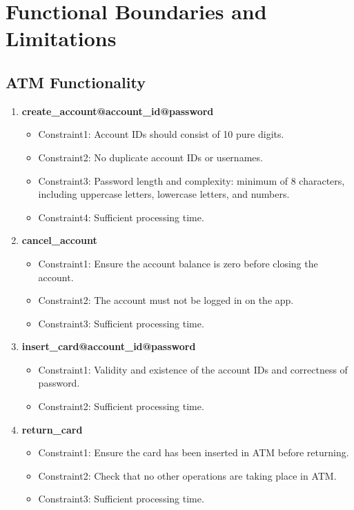 \documentclass[12pt]{article}
\begin{document}
\section{Functional Boundaries and Limitations}
\subsection{ATM Functionality}

\begin{enumerate}
    \item \textbf{create\_account@account\_id@password}
        \begin{itemize}

            \item Constraint1: Account IDs should consist of 10 pure digits.
            \item Constraint2: No duplicate account IDs or usernames.
            \item Constraint3: Password length and complexity: minimum of 8 characters, including uppercase letters, lowercase letters, and numbers.
            \item Constraint4: Sufficient processing time.
        \end{itemize}
        
    \item \textbf{cancel\_account}
        \begin{itemize}
            \item Constraint1: Ensure the account balance is zero before closing the account.
            \item Constraint2: The account must not be logged in on the app.
            \item Constraint3: Sufficient processing time.
        \end{itemize}
        
    \item \textbf{insert\_card@account\_id@password}
        \begin{itemize}
            \item Constraint1: Validity and existence of the account IDs and correctness of password.
            \item Constraint2: Sufficient processing time.
        \end{itemize}
        
    \item \textbf{return\_card}
        \begin{itemize}
            \item Constraint1: Ensure the card has been inserted in ATM before returning.
            \item Constraint2: Check that no other operations are taking place in ATM.
            \item Constraint3: Sufficient processing time.
        \end{itemize}
        

\end{enumerate}
\end{document}
